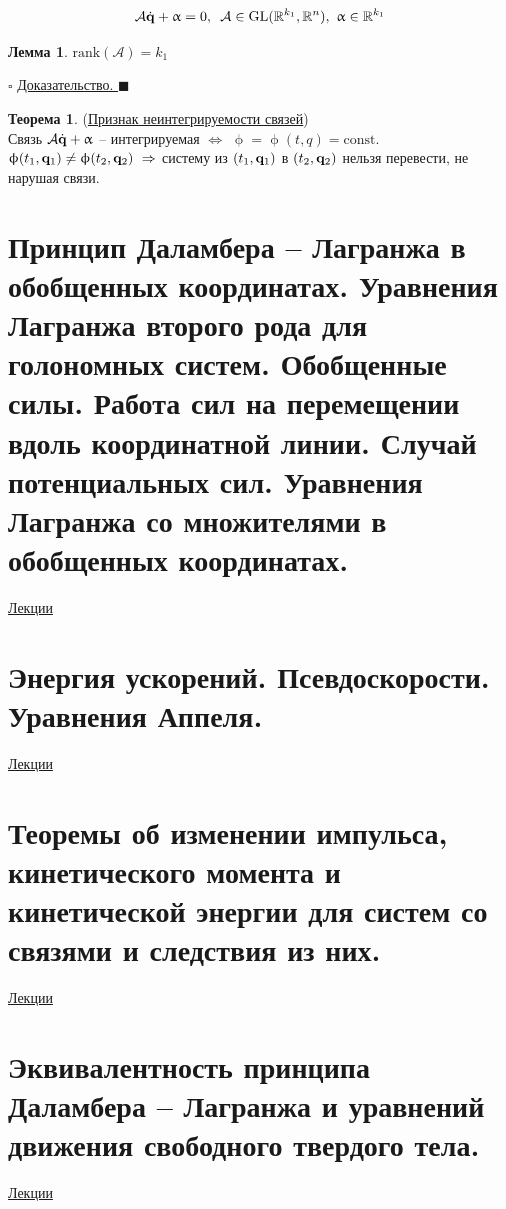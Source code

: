 \documentclass[specialist, subf, href, colorlinks=true, 12pt, times, mtpro, final]{disser}
\theoremstyle{definition}
\newtheorem{theorem}{Теорема}[section]
\newtheorem{lemma}{Лемма}[section]
\def\rk{\text{rank}}
\def\const{\text{const}}
\def\bfqd{\dot{\bfq}}
\def\bfalpha{\upalpha}
\def\bfphi{\upphi}
\begin{document}
    $$
    \mathcal{A}\bfqd+\bfalpha = 0,\,\,\, \mathcal{A}\in\text{GL}(\mathbb{R}^{k_1},\mathbb{R}^n),\,\,\bfalpha\in\mathbb{R}^{k_1}
    $$
    \begin{lemma} 
    $\rk(\mathcal{A}) = k_1$
    \end{lemma}
    \noindent$\square$ \hyperlink{first_lects.10}{ Доказательство. } $\blacksquare$
    \begin{theorem} (\hyperlink{first_lects.10}{Признак неинтегрируемости связей})\\
    Связь $\mathcal{A}\bfqd+\bfalpha$ -- интегрируемая $\Longleftrightarrow$
    $\bfphi=\bfphi(t,q)=\const$.\\
    $\bfphi(t_1,\bfq_1)\ne\bfphi(t_2,\bfq_2)\,\,\Rightarrow$ систему из $(t_1,\mathbf{q}_1)$ в
    $(t_2,\mathbf{q}_2)$ нельзя перевести, не нарушая связи.
    \end{theorem}

	\section{Принцип Даламбера – Лагранжа в обобщенных координатах. Уравнения Лагранжа второго рода для голономных систем. Обобщенные силы. Работа сил на перемещении вдоль координатной линии. Случай потенциальных сил. Уравнения Лагранжа со множителями в обобщенных координатах.}
	 \label{3}
	\hyperlink {first_lects.14}{Лекции} \\
	
    \section{Энергия ускорений. Псевдоскорости. Уравнения Аппеля.}
     \label{4}
   	\hyperlink {first_lects.19}{Лекции} \\
   	
    \section{Теоремы об изменении импульса, кинетического момента и кинетической энергии для систем со связями и следствия из них.}
    \label{5}
    \hyperlink {first_lects.22}{Лекции} \\
    
    \section{Эквивалентность принципа Даламбера – Лагранжа и уравнений движения свободного твердого тела.}
     \label{6}
    \hyperlink {first_lects.27}{Лекции} \\
    
\end{document}
